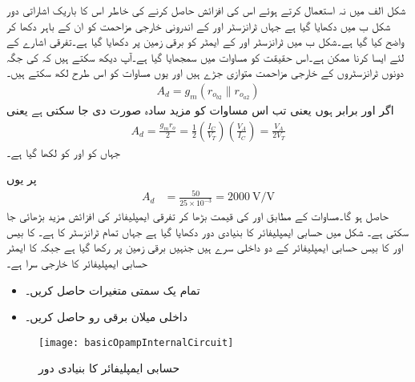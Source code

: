 شکل  الف میں  نہ استعمال کرتے ہوئے اس کی افزائش حاصل کرنے کی خاطر اس کا باریک اشاراتی دور شکل  ب میں دکھایا گیا ہے جہاں ٹرانزسٹر   اور  کے اندرونی خارجی مزاحمت  کو ان کے باہر دکھا کر واضح کیا گیا ہے۔شکل  ب میں ٹرانزسٹر  اور  کے ایمٹر کو برقی زمین پر دکھایا گیا ہے۔تفرقی اشارے کے لئے ایسا کرنا ممکن ہے۔اس حقیقت کو مساوات  میں سمجھایا گیا ہے۔آپ دیکھ سکتے ہیں کہ  کی جگہ دونوں ٹرانزسٹروں کے خارجی مزاحمت متوازی جڑے ہیں اور یوں مساوات    کو اس طرح لکھ سکتے ہیں۔
\begin{align} \label{مساوات_تفرقی_ٹرانزسٹر_لدھا_بڑھاتی_الف}
A_d=g_m \left( r_{o_{b2}} \parallel r_{o_{a2}} \right )
\end{align}
اگر  اور  برابر ہوں یعنی    تب اس مساوات کو مزید سادہ صورت دی جا سکتی ہے یعنی
\begin{align}\label{مساوات_تفرقی_سادہ_ترین_کی_افزائش}
A_d=\frac{g_m r_o}{2}=\frac{1}{2} \left(\frac{I_C}{V_T} \right ) \left(\frac{V_A}{I_C} \right )=\frac{V_A}{2 V_T}
\end{align}
جہاں   کو  اور   کو  لکھا گیا ہے۔

 پر یوں 
\begin{align*}
A_d&=\frac{50}{25 \times 10^{-3}}=\SI{2000}{\volt \per \volt}
\end{align*}
حاصل ہو گا۔مساوات   کے مطابق  اور   کی قیمت بڑھا کر تفرقی ایمپلیفائر کی افزائش مزید بڑھائی جا سکتی ہے۔
شکل  میں حسابی ایمپلیفائر کا بنیادی دور دکھایا گیا ہے جہاں تمام ٹرانزسٹر کا  ہے۔ کا بیس  اور  کا بیس حسابی ایمپلیفائر کے دو داخلی سرے ہیں جنہیں برقی زمین پر رکھا گیا ہے جبکہ  کا ایمٹر حسابی ایمپلیفائر کا خارجی سرا ہے۔
\begin{itemize}
\item
تمام یک سمتی متغیرات حاصل کریں۔
\item
داخلی میلان برقی رو  حاصل کریں۔
\end{itemize}

\begin{figure}
\centering
\texttt{[image: basicOpampInternalCircuit]}
\caption{حسابی ایمپلیفائر کا بنیادی دور}
\label{شکل_تفرقی_حسابی_ایمپلیفائر_بنیادی_دور}
\end{figure}

